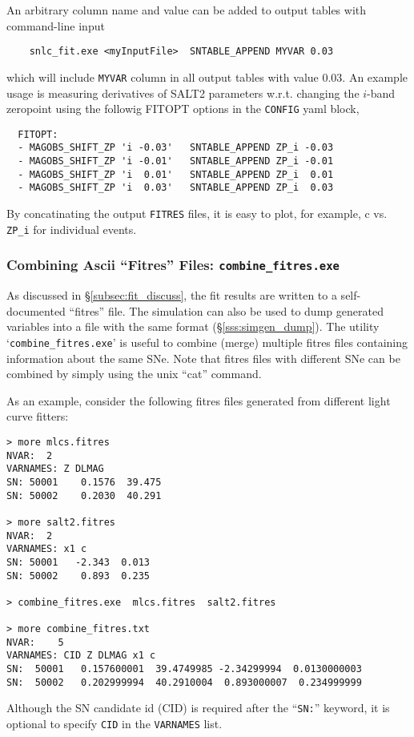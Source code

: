 \documentclass[12pt]{article}
\begin{document}
{An arbitrary column name and value can be added to output tables with
command-line input
\begin{verbatim}
    snlc_fit.exe <myInputFile>  SNTABLE_APPEND MYVAR 0.03
\end{verbatim}
which will include {\tt MYVAR} column in all output tables with value 0.03.
An example usage is measuring derivatives of SALT2 parameters w.r.t. 
changing the $i$-band zeropoint using the followig FITOPT options
in the {\tt CONFIG} yaml block,
%
\begin{verbatim}
  FITOPT:
  - MAGOBS_SHIFT_ZP 'i -0.03'   SNTABLE_APPEND ZP_i -0.03
  - MAGOBS_SHIFT_ZP 'i -0.01'   SNTABLE_APPEND ZP_i -0.01
  - MAGOBS_SHIFT_ZP 'i  0.01'   SNTABLE_APPEND ZP_i  0.01
  - MAGOBS_SHIFT_ZP 'i  0.03'   SNTABLE_APPEND ZP_i  0.03
\end{verbatim}
By concatinating the output {\tt FITRES} files, it is easy to plot,
for example, c vs. {\tt ZP\_i} for individual events.

  \subsubsection{Combining Ascii ``Fitres'' Files: {\tt combine\_fitres.exe}}
  \label{sss:combine_fitres}

As discussed in \S\ref{subsec:fit_discuss},
the fit results are written to a self-documented
``fitres'' file.  The simulation can also be
used to dump generated variables into a file
with the same format (\S\ref{sss:simgen_dump}).
The utility `{\tt combine\_fitres.exe}' is useful to
combine (merge) multiple fitres files containing
information about the same SNe.  Note that fitres
files with different SNe can be combined by simply
using the unix ``cat'' command.

As an example, consider the following fitres files
generated from different light curve fitters:
\clearpage
\begin{Verbatim}[frame=single]
> more mlcs.fitres
NVAR:  2
VARNAMES: Z DLMAG 
SN: 50001    0.1576  39.475  
SN: 50002    0.2030  40.291  

> more salt2.fitres
NVAR:  2
VARNAMES: x1 c
SN: 50001   -2.343  0.013
SN: 50002    0.893  0.235

> combine_fitres.exe  mlcs.fitres  salt2.fitres

> more combine_fitres.txt
NVAR:    5
VARNAMES: CID Z DLMAG x1 c 
SN:  50001   0.157600001  39.4749985 -2.34299994  0.0130000003
SN:  50002   0.202999994  40.2910004  0.893000007  0.234999999
\end{Verbatim}
%
Although the SN candidate id (CID) is required
after the ``{\tt SN:}'' keyword, it is optional to specify
{\tt CID} in the {\tt VARNAMES} list.

}
\end{document}
